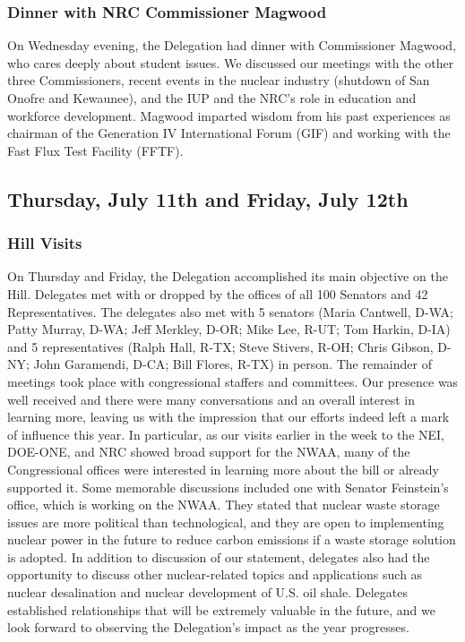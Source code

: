 \subsubsection*{Dinner with NRC Commissioner Magwood}

On Wednesday evening, the Delegation had dinner with Commissioner Magwood, who
cares deeply about student issues. We discussed our meetings with the other
three Commissioners, recent events in the nuclear industry (shutdown of San
Onofre and Kewaunee), and the IUP and the NRC’s role in education and workforce
development. Magwood imparted wisdom from his past experiences as chairman of
the Generation IV International Forum (GIF) and working with the Fast Flux Test
Facility (FFTF).

\subsection*{Thursday, July 11th and Friday, July 12th}

\subsubsection*{Hill Visits}

On Thursday and Friday, the Delegation accomplished its main objective on the
Hill. Delegates met with or dropped by the offices of all 100 Senators and 42
Representatives. The delegates also met with 5 senators (Maria Cantwell, D-WA;
Patty Murray, D-WA; Jeff Merkley, D-OR; Mike Lee, R-UT; Tom Harkin, D-IA) and 5
representatives (Ralph Hall, R-TX; Steve Stivers, R-OH; Chris Gibson, D-NY; John
Garamendi, D-CA; Bill Flores, R-TX) in person. The remainder of meetings took
place with congressional staffers and committees. Our presence was well received
and there were many conversations and an overall interest in learning more,
leaving us with the impression that our efforts indeed left a mark of influence
this year. In particular, as our visits earlier in the week to the NEI, DOE-ONE,
and NRC showed broad support for the NWAA, many of the Congressional offices
were interested in learning more about the bill or already supported it. Some
memorable discussions included one with Senator Feinstein’s office, which is
working on the NWAA. They stated that nuclear waste storage issues are more
political than technological, and they are open to implementing nuclear power in
the future to reduce carbon emissions if a waste storage solution is adopted. In
addition to discussion of our statement, delegates also had the opportunity to
discuss other nuclear-related topics and applications such as nuclear
desalination and nuclear development of U.S. oil shale. Delegates established
relationships that will be extremely valuable in the future, and we look forward
to observing the Delegation’s impact as the year progresses.

